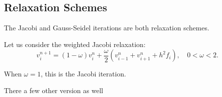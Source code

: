 \documentclass[../main/main.tex]{subfiles}
\begin{document}
\subsection{Relaxation Schemes}
The Jacobi and Gauss-Seidel iterations are both relaxation schemes. 

Let us consider the weighted Jacobi relaxation: \[
    v^{n+1}_i = (1-\omega) v^{n}_i + \frac{\omega}{2}(v^{n}_{i-1} + v^{n}_{i+1} + h^2 f_i), \quad0 < \omega < 2
.\] 
\begin{remark}
    When $\omega=1$, this is the Jacobi iteration.
\end{remark}

There a few other version as well
\end{document}
